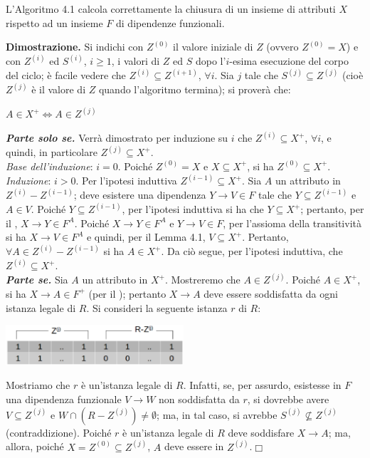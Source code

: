 \begin{theo}
L'Algoritmo 4.1 calcola correttamente la chiusura di un insieme di attributi $X$ rispetto ad un insieme $F$ 
di dipendenze funzionali.
\end{theo}
\textbf{Dimostrazione.} Si indichi con $Z^{(0)}$ il valore iniziale di $Z$ (ovvero $Z^{(0)} = X$) e con 
$Z^{(i)}$ ed $S^{(i)}$, $i \geq 1$, i valori di $Z$ ed $S$ dopo l'$i$-esima esecuzione del corpo del ciclo; 
\`e facile vedere che $Z^{(i)} \subseteq Z^{(i+1)}$, $\forall i$. Sia $j$ tale che $S^{(j)} \subseteq Z^{(j)}$
(cio\`e $Z^{(j)}$ \`e il valore di $Z$ quando l'algoritmo termina); si proverà che:
\begin{center}
 \begin{math}
   A \in X^+ \Leftrightarrow A \in Z^{(j)}
 \end{math}
\end{center}
\emph{\textbf{Parte solo se.}} Verrà dimostrato per induzione su $i$ che $Z^{(i)} \subseteq X^+$, $\forall i$, 
e quindi, in particolare $Z^{(j)} \subseteq X^+$.\\
\emph{Base dell'induzione}: $i=0$. Poiché $Z^{(0)} = X$ e $X\subseteq X^+$, si ha $Z^{(0)} \subseteq X^+$.\\
\emph{Induzione}: $i>0$. Per l'ipotesi induttiva $Z^{(i-1)} \subseteq X^+$. Sia $A$ un attributo in $Z^{(i)}
-Z^{(i-1)}$; deve esistere una dipendenza $Y \rightarrow V \in F$ tale che $Y\subseteq Z^{(i-1)}$ e $A \in V$.
Poiché $Y \subseteq Z^{(i-1)}$, per l'ipotesi induttiva si ha che $Y \subseteq X^+$; pertanto, per il 
, $X \rightarrow Y \in F^A$. Poiché $X \rightarrow Y \in F^A$ e $Y \rightarrow V
\in F$, per l'assioma della transitività si ha $X \rightarrow V \in F^A$ e quindi, per il Lemma 4.1, $V 
\subseteq X^+$. Pertanto, $\forall A \in Z^{(i)} -Z^{(i-1)}$ si ha $A \in X^+$. Da ciò segue, per l'ipotesi 
induttiva, che $Z^{(i)} \subseteq X^+$.\\
\emph{\textbf{Parte se.}} Sia $A$ un attributo in $X^+$. Mostreremo che $A \in Z^{(j)}$. Poiché $A \in X^+$,
si ha $X \rightarrow A \in F^+$ (per il ); pertanto $X \rightarrow A$ deve 
essere soddisfatta da ogni istanza legale di $R$. Si consideri la seguente istanza $r$ di $R$:
\begin{center}
 \includegraphics[width=250px]{img_4_4_3.eps}
\end{center}
Mostriamo che $r$ è un'istanza legale di $R$. Infatti, se, per assurdo, esistesse in $F$ una dipendenza
funzionale $V \rightarrow W$ non soddisfatta da $r$, si dovrebbe avere $V \subseteq Z^{(j)}$ e $W \cap 
(R-Z^{(j)})\not = \emptyset$; ma, in tal caso, si avrebbe $S^{(j)} \not \subseteq Z^{(j)}$ (contraddizione).
Poiché $r$ è un'istanza legale di $R$ deve soddisfare $X \rightarrow A$; ma, allora, poiché $X = Z^{(0)} 
\subseteq Z^{(j)}$, $A$ deve essere in $Z^{(j)}$.\hfill $\Box$\\

